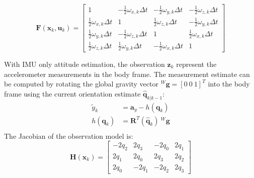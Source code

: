 \begin{equation}
	\boldsymbol{F}(\boldsymbol{x}_{k}, \boldsymbol{u}_{k}) = \begin{bmatrix}
		1                               & -\frac{1}{2}\omega_{x,k}\Delta t & -\frac{1}{2}\omega_{y,k}\Delta t & -\frac{1}{2}\omega_{z,k}\Delta t \\
		\frac{1}{2}\omega_{x,k}\Delta t & 1                                & \frac{1}{2}\omega_{z,k}\Delta t  & -\frac{1}{2}\omega_{y,k}\Delta t \\
		\frac{1}{2}\omega_{y,k}\Delta t & -\frac{1}{2}\omega_{z,k}\Delta t & 1                                & \frac{1}{2}\omega_{x,k}\Delta t  \\
		\frac{1}{2}\omega_{z,k}\Delta t & \frac{1}{2}\omega_{y,k}\Delta t  & -\frac{1}{2}\omega_{x,k}\Delta t & 1
	\end{bmatrix}
\end{equation}

With IMU only attitude estimation, the observation $\boldsymbol{z}_k$ represent the accelerometer measurements in the body frame.
The measurement estimate can be computed by rotating the global gravity vector ${}^{W}\boldsymbol{g} = [0\ 0\ 1]^T$ into the body frame using the current orientation estimate $\hat{\boldsymbol{q}}_{k|k-1}$:
\begin{equation}
	\begin{aligned}
		\tilde{y}_k         & = \boldsymbol{a}_y - h(\boldsymbol{q}_k)                       \\
		h(\boldsymbol{q}_k) & = \mathbf{R}^T(\hat{\boldsymbol{q}}_{k})\ {}^{W}\boldsymbol{g} \\
	\end{aligned}
\end{equation}
The Jacobian of the observation model is:
\begin{equation}
	\boldsymbol{H}(\boldsymbol{x}_k) = \begin{bmatrix}
		-2q_2 & 2q_3  & -2q_0 & 2q_1 \\
		2q_1  & 2q_0  & 2q_3  & 2q_2 \\
		2q_0  & -2q_1 & -2q_2 & 2q_3
	\end{bmatrix}
\end{equation}